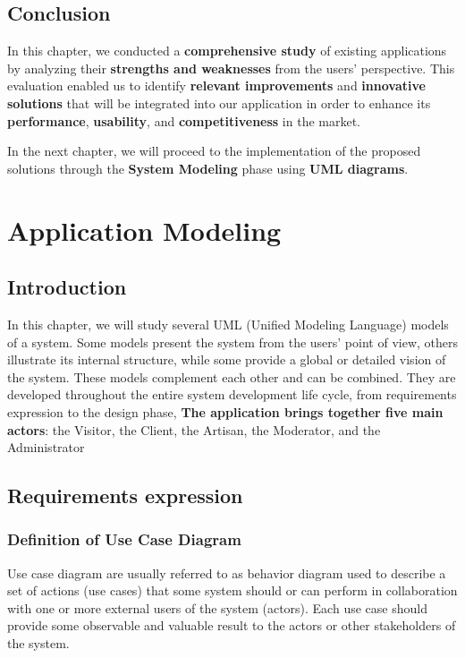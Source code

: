 \documentclass[12pt,a4paper]{report}
\begin{document}
\section{Conclusion}

In this chapter, we conducted a \textbf{comprehensive study} of existing applications by analyzing their \textbf{strengths and weaknesses} from the users’ perspective. This evaluation enabled us to identify \textbf{relevant improvements} and \textbf{innovative solutions} that will be integrated into our application in order to enhance its \textbf{performance}, \textbf{usability}, and \textbf{competitiveness} in the market. 

In the next chapter, we will proceed to the implementation of the proposed solutions through the \textbf{System Modeling} phase using \textbf{UML diagrams}.



\chapter{Application Modeling}
\section{\textbf{Introduction}}
    In this chapter, we will study several UML (Unified Modeling Language) models of a system. Some models present the system from the users’ point of view, others illustrate its internal structure, while some provide a global or detailed vision of the system. These models complement each other and can be combined. They are developed throughout the entire system development life cycle, from requirements expression to the design phase,
\textbf{The application brings together five main actors}: the Visitor, the Client, the Artisan, the Moderator, and the Administrator   
\section{Requirements expression}
 \subsection{Definition of Use Case Diagram}

Use case diagram are usually referred to as behavior diagram used to describe a set of 
actions (use cases) that some system should or can perform in collaboration with one or 
more external users of the system (actors). Each use case should provide some observable 
and valuable result to the actors or other stakeholders of the system\cite{ref1}.
\end{document}
